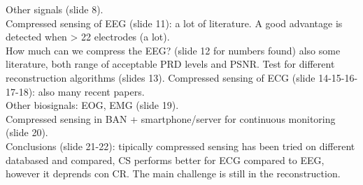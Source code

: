 Other signals (slide 8).\\
Compressed sensing of EEG (slide 11): a lot of literature. A good advantage is detected when > 22 electrodes (a lot). \\
How much can we compress the EEG? (slide 12 for numbers found) also some literature, both range of acceptable PRD levels and PSNR. Test for different reconstruction algorithms (slides 13).
Compressed sensing of ECG (slide 14-15-16-17-18): also many recent papers.\\
Other biosignals: EOG, EMG (slide 19).\\
Compressed sensing in BAN + smartphone/server for continuous monitoring (slide 20).\\
Conclusions (slide 21-22): tipically compressed sensing has been tried on different databased and compared, CS performs better for ECG compared to EEG, however it deprends con CR. The main challenge is still in the reconstruction.\\

